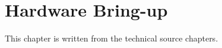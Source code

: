 \chapter{Hardware Bring-up}\label{ch:bringup}

This chapter is written from the technical source chapters.
